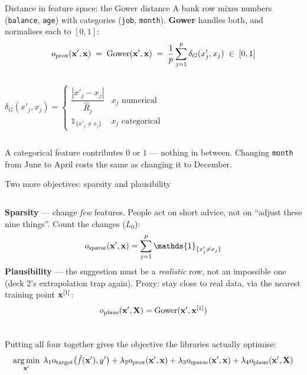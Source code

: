 \documentclass[aspectratio=169]{beamer}
\begin{document}
\begin{frame}{Distance in feature space: the Gower distance}
  A bank row mixes numbers (\texttt{balance}, \texttt{age}) with categories (\texttt{job},
  \texttt{month}). \textbf{Gower} handles both, and normalises each to $[0,1]$:
  \[
    o_{\text{prox}}(\mathbf{x}', \mathbf{x}) \;=\; \mathrm{Gower}(\mathbf{x}', \mathbf{x})
      \;=\; \frac{1}{p}\sum_{j=1}^{p} \delta_G(x'_j, x_j) \;\in\; [0,1]
  \]
  \begin{columns}[T]
    \[
      \delta_G(x'_j, x_j) =
      \begin{cases}
        \dfrac{|x'_j - x_j|}{\widehat{R}_j} & x_j \text{ numerical} \\[8pt]
        \mathds{1}_{\{x'_j \neq x_j\}} & x_j \text{ categorical}
      \end{cases}
    \]
  \end{columns}
  \vskip 4pt
  {\footnotesize A categorical feature contributes $0$ or $1$ --- nothing in between. Changing
  \texttt{month} from June to April costs the same as changing it to December.}
  \vskip 4pt
\end{frame}

\begin{frame}{Two more objectives: sparsity and plausibility}
  \begin{columns}[T]
    \textbf{Sparsity} --- change \emph{few} features. People act on short advice, not on
    ``adjust these nine things''. Count the changes ($L_0$):
    \[ o_{\text{sparse}}(\xv', \xv) = \sum_{j=1}^{p} \mathds{1}_{\{x'_j \neq x_j\}} \]
    \textbf{Plausibility} --- the suggestion must be a \emph{realistic} row, not an impossible one
    (deck 2's extrapolation trap again). Proxy: stay close to real data, via the nearest training
    point $\mathbf{x}^{[1]}$:
    \[ o_{\text{plaus}}(\mathbf{x}', \mathbf{X}) = \mathrm{Gower}(\mathbf{x}', \mathbf{x}^{[1]}) \]
  \end{columns}
  \vskip 6pt
  Putting all four together gives the objective the libraries actually optimise:
  \[
    \mathop{\mathrm{arg\,min}}_{\mathbf{x}'} \;
    \lambda_1 o_{\text{target}}\big(\hat f(\mathbf{x}'), y'\big)
    + \lambda_2 o_{\text{prox}}(\mathbf{x}', \mathbf{x})
    + \lambda_3 o_{\text{sparse}}(\mathbf{x}', \mathbf{x})
    + \lambda_4 o_{\text{plaus}}(\mathbf{x}', \mathbf{X})
  \]
  \vskip 4pt
\end{frame}
\end{document}

